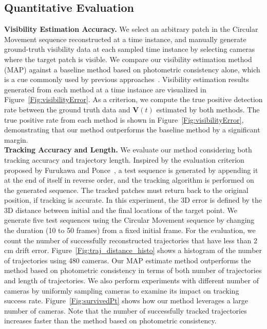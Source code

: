 \subsection{Quantitative Evaluation}
\noindent\textbf{Visibility Estimation Accuracy.} We select an arbitrary patch in the Circular Movement sequence reconstructed at a time instance, and manually generate ground-truth visibility data at each sampled time instance by selecting cameras where the target patch is visible. We compare our visibility estimation method (MAP) against a baseline method based on photometric consistency alone, which is a cue commonly used by previous approaches~\cite{Carceroni2002,Devernay2006,Furukawa-2008}. Visibility estimation results generated from each method at a time instance are visualized in Figure~\ref{Fig:visibilityError}. As a criterion, we compute the true positive detection rate between the ground truth data and $\mathbf{V}(t)$ estimated by both methods. The true positive rate from each method is shown in Figure~\ref{Fig:visibilityError}, demonstrating that our method outperforms the baseline method by a significant margin.\\ %
\noindent \textbf{Tracking Accuracy and Length.}
We evaluate our method considering both tracking accuracy and trajectory length. Inspired by the evaluation criterion proposed by Furukawa and Ponce~\cite{Furukawa-2008}, a test sequence is generated by appending it at the end of itself in reverse order, and the tracking algorithm is performed on the generated sequence. The tracked patches must return back to the original position, if tracking is accurate. In this experiment, the 3D error is defined by the 3D distance between initial and the final locations of the target point. We generate five test sequences using the Circular Movement sequence by changing the duration (10 to 50 frames) from a fixed initial frame. For the evaluation, we count the number of successfully reconstructed trajectories that have less than 2 cm drift error. Figure~\ref{Fig:traj_distance_histo} shows a histogram of the number of trajectories using 480 cameras.  Our MAP estimate method outperforms the method based on photometric consistency in terms of both number of trajectories and length of trajectories. We also perform experiments with different number of cameras by uniformly sampling cameras to examine its impact on tracking success rate. Figure~\ref{Fig:survivedPt} shows how our method leverages a large number of cameras. Note that the number of successfully tracked trajectories increases faster than the method based on photometric consistency. 


